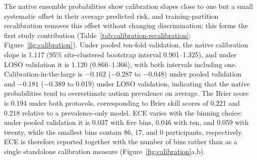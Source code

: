 The native ensemble probabilities show calibration slopes close to one but a small systematic offset in their average predicted risk, and training-partition recalibration removes this offset without changing discrimination; this forms the first study contribution (Table~\ref{tab:calibration-recalibration}; Figure~\ref{fig:calibration}). Under pooled ten-fold validation, the native calibration slope is 1.117 (95\% site-clustered bootstrap interval 0.901--1.325), and under LOSO validation it is 1.120 (0.866--1.366), with both intervals including one. Calibration-in-the-large is $-0.162$ ($-0.287$ to $-0.048$) under pooled validation and $-0.181$ ($-0.389$ to 0.019) under LOSO validation, indicating that the native probabilities tend to overestimate autism prevalence on average. The Brier score is 0.194 under both protocols, corresponding to Brier skill scores of 0.221 and 0.218 relative to a prevalence-only model. ECE varies with the binning choice: under pooled validation it is 0.037 with five bins, 0.046 with ten, and 0.059 with twenty, while the smallest bins contain 86, 17, and 0 participants, respectively. ECE is therefore reported together with the number of bins rather than as a single standalone calibration measure (Figure~\ref{fig:calibration}a,b).

